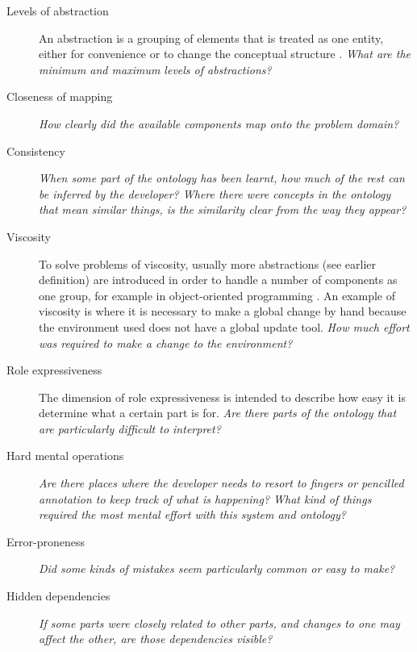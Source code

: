 \begin{description}
  \item[Levels of abstraction] 	\label{cdDef}
	An abstraction is a grouping of elements that is treated as one entity, either for convenience or to change the conceptual structure \cite{Green1996}. \emph{What are the minimum and maximum levels of abstractions?}
    \item[Closeness of mapping] \emph{How clearly did the available components map onto the problem domain?}
	\item[Consistency] \emph{When some part of the ontology has been learnt, how much of the rest can be inferred by the developer? Where there were concepts in the ontology that mean similar things, is the similarity clear from the way they appear?}
	\item[Viscosity] To solve problems of viscosity, usually more abstractions (see earlier definition) are introduced in order to handle a number of components as one group, for example in object-oriented programming \cite{Green1996}. An example of viscosity is where it is necessary to make a global change by hand because the environment used does not have a global update tool. \emph{How much effort was required to make a change to the environment?}
	\item[Role expressiveness]
		The dimension of role expressiveness is intended to describe how easy it is determine what a certain part is for. \emph{Are there parts of the ontology that are particularly difficult to interpret?}
	\item[Hard mental operations] \emph{Are there places where the developer needs to resort to fingers or pencilled annotation to keep track of what is happening? What kind of things required the most mental effort with this system and ontology?}
	\item[Error-proneness] \emph{Did some kinds of mistakes seem particularly common or easy to make?}
	\item[Hidden dependencies] \emph{If some parts were closely related to other parts, and changes to one may affect the other, are those dependencies visible? }
\end{description}


 


